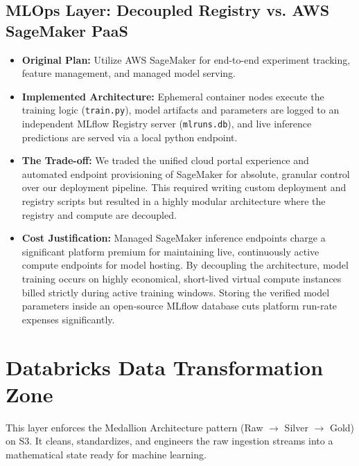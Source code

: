 \documentclass[11pt,a4paper]{article}
\begin{document}
\subsection{MLOps Layer: Decoupled Registry vs. AWS SageMaker PaaS}
\begin{itemize}[leftmargin=*]
    \item \textbf{Original Plan:} Utilize AWS SageMaker for end-to-end experiment tracking, feature management, and managed model serving.
    \item \textbf{Implemented Architecture:} Ephemeral container nodes execute the training logic (\texttt{train.py}), model artifacts and parameters are logged to an independent MLflow Registry server (\texttt{mlruns.db}), and live inference predictions are served via a local python endpoint.
    \item \textbf{The Trade-off:} We traded the unified cloud portal experience and automated endpoint provisioning of SageMaker for absolute, granular control over our deployment pipeline. This required writing custom deployment and registry scripts but resulted in a highly modular architecture where the registry and compute are decoupled.
    \item \textbf{Cost Justification:} Managed SageMaker inference endpoints charge a significant platform premium for maintaining live, continuously active compute endpoints for model hosting. By decoupling the architecture, model training occurs on highly economical, short-lived virtual compute instances billed strictly during active training windows. Storing the verified model parameters inside an open-source MLflow database cuts platform run-rate expenses significantly.
\end{itemize}

\section{Databricks Data Transformation Zone}
This layer enforces the Medallion Architecture pattern (Raw $\rightarrow$ Silver $\rightarrow$ Gold) on S3. It cleans, standardizes, and engineers the raw ingestion streams into a mathematical state ready for machine learning.
\end{document}
